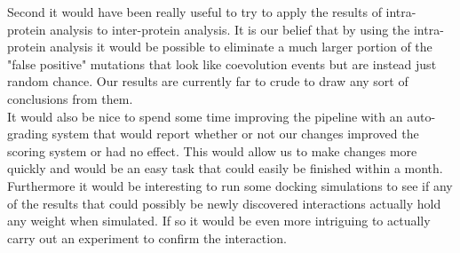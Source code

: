 \documentclass[11pt]{article}
\begin{document}
Second it would have been really useful to try to apply the results of
intra-protein analysis to inter-protein analysis. It is our belief
that by using the intra-protein analysis it would be possible to
eliminate a much larger portion of the "false positive" mutations that
look like coevolution events but are instead just random chance. Our
results are currently far to crude to draw any sort of conclusions
from them. \\

It would also be nice to spend some time improving the pipeline with
an auto-grading system that would report whether or not our changes
improved the scoring system or had no effect. This would allow us to
make changes more quickly and would be an easy task that could easily be
finished within a month. \\

Furthermore it would be interesting to run some docking simulations to
see if any of the results that could possibly be newly discovered
interactions actually hold any weight when simulated. If so it would
be even more intriguing to actually carry out an experiment to confirm
the interaction.
\end{document}
